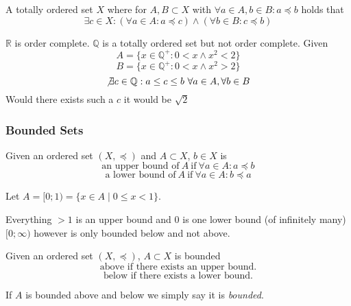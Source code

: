 \begin{definition}
   A totally ordered set \(X\) where for \(A, B \subset X\) with \(\forall a \in A, b \in B: a \preceq b\) holds that
   \[\exists c \in X: (\forall a \in A: a \preceq c) \land (\forall b \in B: c \preceq b)\]
\end{definition}
\begin{example}
   \(\mathbb{R}\) is order complete.
   \(\mathbb{Q}\) is a totally ordered set but not order complete.
   Given
   \[A = \{x \in \mathbb{Q}^+: 0 < x \land x^2 < 2\}\]
   \[B = \{x \in \mathbb{Q}^+: 0 < x \land x^2 > 2\}\]
   \[\not\exists c \in \mathbb{Q}: a \leq c \leq b~\forall a \in A, \forall b \in B\]
   Would there exists such a \(c\) it would be \(\sqrt{2}\)
\end{example}

\subsubsection{Bounded Sets}
\begin{definition}
   Given an ordered set \((X, \preceq)\) and \(A \subset X\), \(b \in X\) is
   \[\text{an upper bound of}~A~\text{if}~\forall a \in A: a \preceq b\]
   \[\text{a lower bound of}~A~\text{if}~\forall a \in A: b \preceq a\]
\end{definition}
\begin{example}
   Let \(A = [0;1) = \{x \in A \mid 0 \leq x < 1\}\).

   Everything \(> 1\) is an upper bound and \(0\) is one lower bound (of infinitely many)
   \([0;\infty)\) however is only bounded below and not above.
\end{example}

\begin{definition}
   Given an ordered set \((X, \preceq)\), \(A \subset X\) is bounded
   \[\text{above if there exists an upper bound.}\]
   \[\text{below if there exists a lower bound.}\]
\end{definition}
\begin{remark}[Terminology]
   If \(A\) is bounded above and below we simply say it is \emph{bounded}.
\end{remark}

